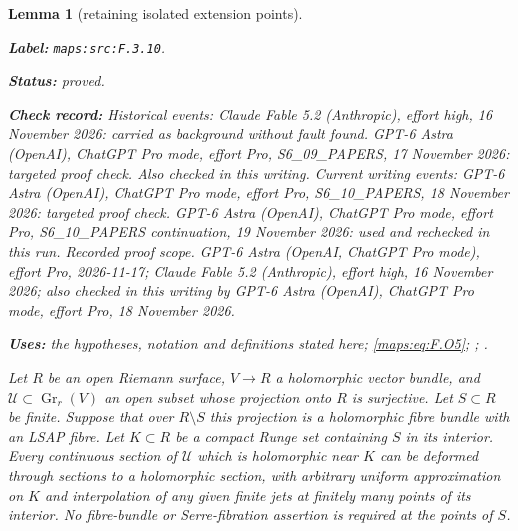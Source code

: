 \documentclass[11pt,a4paper]{article}
\newtheorem{lemma}[lemma]{Lemma}
\theoremstyle{definition}
\newcommand{\StatementRecord}[4]{\par\smallskip\begingroup\upshape\raggedright\noindent\textbf{Label:} \nolinkurl{#1}.\par\noindent\textbf{Status:} #2.\par\noindent\textbf{Check record:} #3.\par\noindent\textbf{Uses:} #4.\par\endgroup\smallskip}
\begin{document}
\begin{lemma}[retaining isolated extension points]\label{maps:src:F.3.10}
\StatementRecord{maps:src:F.3.10}{proved}{Historical events: Claude Fable 5.2 (Anthropic), effort high, 16 November 2026: carried as background without fault found. GPT-6 Astra (OpenAI), ChatGPT Pro mode, effort Pro, S6\_09\_PAPERS, 17 November 2026: targeted proof check. Also checked in this writing. Current writing events: GPT-6 Astra (OpenAI), ChatGPT Pro mode, effort Pro, S6\_10\_PAPERS, 18 November 2026: targeted proof check. GPT-6 Astra (OpenAI), ChatGPT Pro mode, effort Pro, S6\_10\_PAPERS continuation, 19 November 2026: used and rechecked in this run. \emph{Recorded proof scope.} GPT-6 Astra (OpenAI, ChatGPT Pro mode), effort Pro, 2026-11-17; Claude Fable 5.2 (Anthropic), effort high, 16 November 2026; also checked in this writing by GPT-6 Astra (OpenAI), ChatGPT Pro mode, effort Pro, 18 November 2026}{the hypotheses, notation and definitions stated here; \cref{maps:eq:F.O5}; \cite[Theorem 1.2, preprint p.~3]{ffForstnericPrezelj02}; \cite[Theorem 2.13, p.~9]{IVVOkaOneV5}}


Let $R$ be an open Riemann surface, $V\to R$ a holomorphic vector
bundle, and $\mathscr U\subset\operatorname{Gr}_r(V)$ an open
subset whose projection onto $R$ is surjective.  Let $S\subset R$
be finite.  Suppose that over $R\setminus S$ this projection is
a holomorphic fibre bundle with an LSAP fibre.  Let $K\subset R$
be a compact Runge set containing $S$ in its interior.
Every continuous section of $\mathscr U$ which is holomorphic
near $K$ can be deformed through sections to a holomorphic
section, with arbitrary uniform approximation on $K$ and
interpolation of any given finite jets at finitely many points
of its interior.  No fibre-bundle or Serre-fibration assertion
is required at the points of $S$.

\end{lemma}
\end{document}
